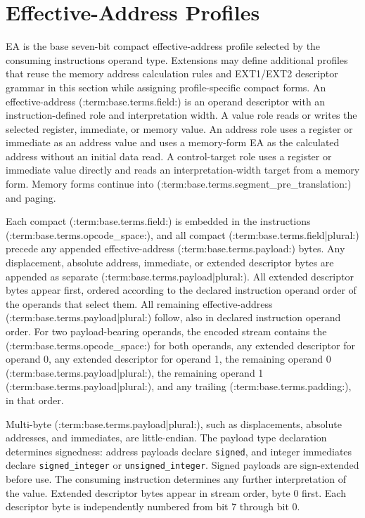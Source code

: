 \clearpage
\section{Effective-Address Profiles}\label{page:effective-addressing-modes}

EA is the base seven-bit compact effective-address profile selected by the consuming instruction\textquotesingle{}s operand
type. Extensions may define additional profiles that reuse the memory address calculation rules and EXT1/EXT2
descriptor grammar in this section while assigning profile-specific compact forms. An effective-address (:term:base.terms.field:) is an operand
descriptor with an instruction-defined role and interpretation width. A
value role reads or writes the selected register, immediate, or memory value. An address role uses a register or
immediate as an address value and uses a memory-form EA as the calculated address without an initial data read. A
control-target role uses a register or immediate value directly and reads an interpretation-width target from a
memory form. Memory forms continue into (:term:base.terms.segment_pre_translation:) and paging.

Each compact (:term:base.terms.field:) is embedded in the instruction\textquotesingle{}s (:term:base.terms.opcode_space:), and all compact (:term:base.terms.field|plural:) precede any appended
effective-address (:term:base.terms.payload:) bytes. Any displacement, absolute address, immediate, or extended
descriptor bytes are appended as separate (:term:base.terms.payload|plural:). All extended descriptor bytes appear first, ordered according to the
declared instruction operand order of the operands that select them. All remaining effective-address (:term:base.terms.payload|plural:) follow, also in
declared instruction operand order.
For two payload-bearing operands, the encoded stream contains the (:term:base.terms.opcode_space:) for both operands, any extended descriptor for
operand 0, any extended descriptor for operand 1, the remaining operand 0 (:term:base.terms.payload|plural:), the remaining operand 1
(:term:base.terms.payload|plural:), and any trailing (:term:base.terms.padding:), in that order.

Multi-byte (:term:base.terms.payload|plural:), such as displacements, absolute addresses, and immediates, are little-endian.
The payload type declaration determines signedness: address payloads declare \texttt{signed}, and integer immediates declare
\texttt{signed_integer} or \texttt{unsigned_integer}. Signed payloads are sign-extended before use. The consuming instruction
determines any further interpretation of the value. Extended descriptor bytes appear in stream order, byte 0 first. Each
descriptor byte is independently numbered from bit 7 through bit 0.

